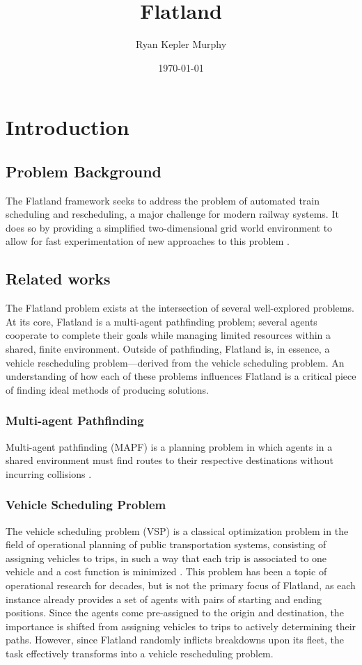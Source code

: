 \documentclass[11pt]{article}
\title{Flatland}
\author{Ryan Kepler Murphy}
\date{\today}
\begin{document}
\maketitle	
\pagebreak

\tableofcontents
\pagebreak


\section{Introduction}
\subsection{Problem Background}
The Flatland framework seeks to address the problem of automated train scheduling and rescheduling, a major challenge
for modern railway systems. It does so by providing a simplified two-dimensional grid world environment to allow for fast experimentation of new approaches to this problem \cite{monylascscbhwaegeibavistsasp20a}. 

\subsection{Related works}
The Flatland problem exists at the intersection of several well-explored problems.  At its core, Flatland is a multi-agent pathfinding problem; several agents cooperate to complete their goals while managing limited resources within a shared, finite environment.  Outside of pathfinding, Flatland is, in essence, a vehicle rescheduling problem—derived from the vehicle scheduling problem.  An understanding of how each of these problems influences Flatland is a critical piece of finding ideal methods of producing solutions.

\subsubsection{Multi-agent Pathfinding}
Multi-agent pathfinding (MAPF) is a planning problem in which agents in a shared environment must find routes to their respective destinations without incurring collisions \cite{silver05a}.

\subsubsection{Vehicle Scheduling Problem}
The vehicle scheduling problem (VSP) is a classical optimization problem in the field of operational planning of public transportation systems, consisting of assigning vehicles to trips, in such a way that each trip is associated to one vehicle and a cost function is minimized \cite{bapeukfa00a}.  This problem has been a topic of operational research for decades, but is not the primary focus of Flatland, as each instance already provides a set of agents with pairs of starting and ending positions. Since the agents come pre-assigned to the origin and destination, the importance is shifted from assigning vehicles to trips to actively determining their paths.  However, since Flatland randomly inflicts breakdowns upon its fleet, the task effectively transforms into a vehicle rescheduling problem.
\end{document}
